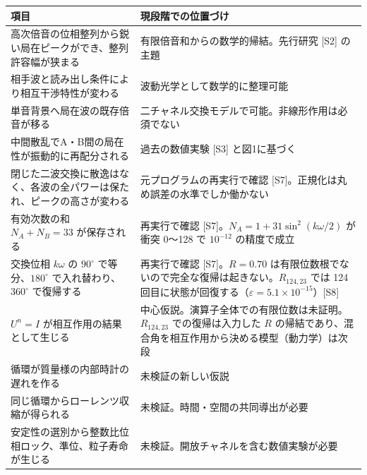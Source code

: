 \documentclass[
  a4paper,
]{ltjsarticle}
\newcounter{none} %
\begin{document}
{\def\LTcaptype{none} %
\begin{longtable}[]{@{}
  >{\raggedright\arraybackslash}p{}
  >{\raggedright\arraybackslash}p{}@{}}
\toprule\noalign{}
\begin{minipage}[b]{\linewidth}\raggedright
項目
\end{minipage} & \begin{minipage}[b]{\linewidth}\raggedright
現段階での位置づけ
\end{minipage} \\
\midrule\noalign{}
\endhead
\bottomrule\noalign{}
\endlastfoot
高次倍音の位相整列から鋭い局在ピークができ、整列許容幅が狭まる &
有限倍音和からの数学的帰結。先行研究 {[}S2{]} の主題 \\
相手波と読み出し条件により相互干渉特性が変わる &
波動光学として数学的に整理可能 \\
単音背景へ局在波の既存倍音が移る &
二チャネル交換モデルで可能。非線形作用は必須でない \\
中間散乱でA・B間の局在性が振動的に再配分される & 過去の数値実験 {[}S3{]}
と図1に基づく \\
閉じた二波交換に散逸はなく、各波の全パワーは保たれ、ピークの高さが変わる
& 元プログラムの再実行で確認
{[}S7{]}。正規化は丸め誤差の水準でしか働かない \\
有効次数の和 \(N_A+N_B=33\) が保存される & 再実行で確認
{[}S7{]}。\(N_A=1+31\sin^2(k\omega/2)\) が衝突 0〜128 で \(10^{-12}\)
の精度で成立 \\
交換位相 \(k\omega\) の \(90^\circ\) で等分、\(180^\circ\)
で入れ替わり、\(360^\circ\) で復帰する & 再実行で確認
{[}S7{]}。\(R=0.70\)
は有限位数根でないので完全な復帰は起きない。\(R_{124,23}\) では 124
回目に状態が回復する（\(\varepsilon=5.1\times10^{-15}\)）{[}S8{]} \\
\(U^n=I\) が相互作用の結果として生じる &
中心仮説。演算子全体での有限位数は未証明。\(R_{124,23}\)
での復帰は入力した \(R\)
の帰結であり、混合角を相互作用から決める模型（動力学）は次段 \\
循環が質量様の内部時計の遅れを作る & 未検証の新しい仮説 \\
同じ循環からローレンツ収縮が得られる &
未検証。時間・空間の共同導出が必要 \\
安定性の選別から整数比位相ロック、準位、粒子寿命が生じる &
未検証。開放チャネルを含む数値実験が必要 \\
\end{longtable}
}
\end{document}
